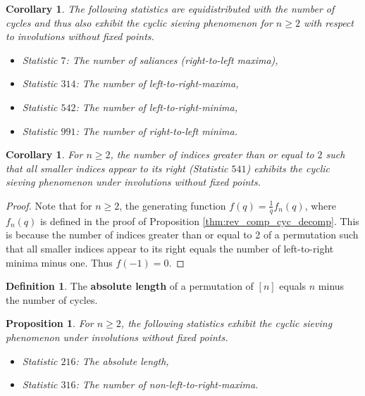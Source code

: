 \documentclass{amsart}
\newtheorem{cor}[thm]{Corollary}
\newtheorem{prop}[thm]{Proposition}
\theoremstyle{definition}
\newtheorem{definition}[thm]{Definition}
\begin{document}
\begin{cor}\label{cor:stat31_etal}
  The following statistics are equidistributed with the number of cycles 
  and thus also exhibit the cyclic sieving phenomenon for $n\geq 2$ with respect to involutions without fixed points.
  \begin{itemize}
    \item Statistic $7$: The number of saliances (right-to-left maxima),
    \item Statistic $314$: The number of left-to-right-maxima,
    \item Statistic $542$: The number of left-to-right-minima,
    \item Statistic $991$: The number of right-to-left minima.
  \end{itemize}
\end{cor}

\begin{cor}\label{cor:rev_and_comp_541}
  For $n \geq 2$, the number of indices greater than or equal to $2$ such that all smaller indices appear to its right (Statistic $541$) exhibits the cyclic sieving phenomenon under involutions without fixed points.
\end{cor}

\begin{proof}
  Note that for $n\geq 2$, the generating function $f(q) = \frac{1}{q} f_n(q)$, where $f_n(q)$ is defined in the proof of  Proposition \ref{thm:rev_comp_cyc_decomp}. This is because the number of indices greater than or equal to 2 of a permutation such that all smaller indices appear to its right equals the number of left-to-right minima minus one.
  Thus $f(-1)=0$. 
\end{proof}

\begin{definition}\label{def:abs_len}
  The \textbf{absolute length} of a permutation of $[n]$ equals
  $n$ minus the number of cycles.
\end{definition}


\begin{prop} \label{thm:rev_comp_abs_len}
  For $n \geq 2$, the following statistics exhibit the cyclic sieving phenomenon under involutions without fixed points.
  \begin{itemize}
    \item Statistic $216$: The absolute length,
    \item Statistic $316$: The number of non-left-to-right-maxima.
  \end{itemize}
\end{prop}
\end{document}

